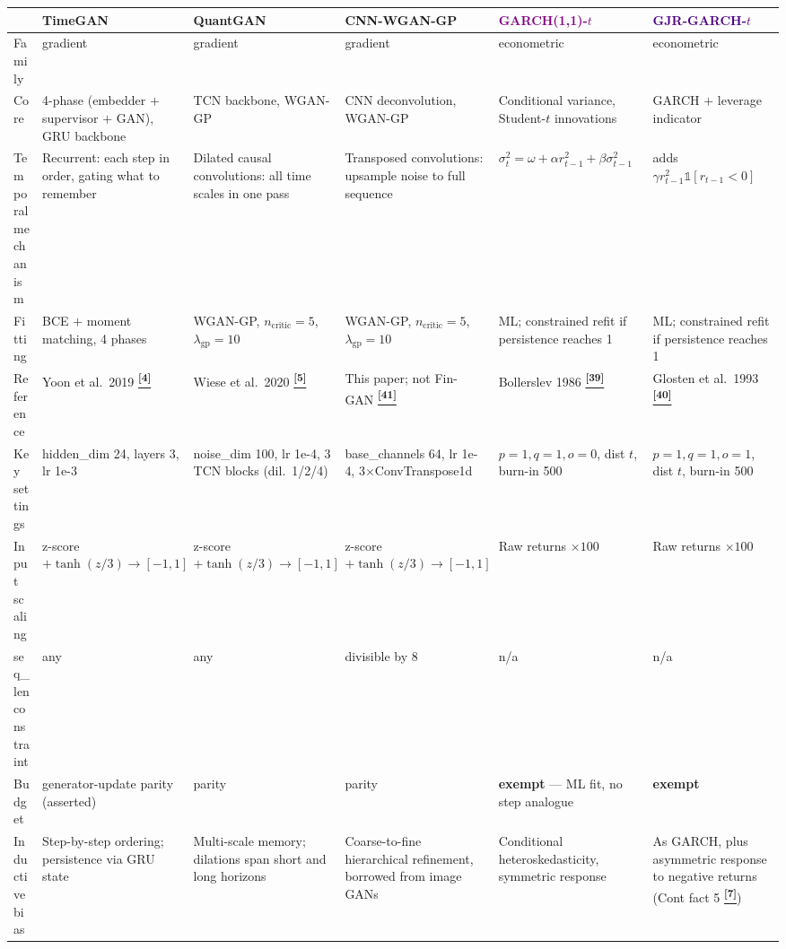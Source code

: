\documentclass[10pt]{article}
\newcommand{\tcite}[1]{%
  \hyperlink{R:#1}{\textsuperscript{\scriptsize\textbf{[#1]}}}}
\begin{document}
\vspace{4pt}
{\footnotesize
\setlength{\tabcolsep}{4pt}
\begin{tabularx}{\linewidth}{@{}lXXXXX@{}}
\toprule
 & \textbf{\textcolor{TGcol}{TimeGAN}} & \textbf{\textcolor{QGcol}{QuantGAN}} & \textbf{\textcolor{FGcol}{CNN-WGAN-GP}} & \textbf{\textcolor{Purple}{GARCH(1,1)-$t$}} & \textbf{\textcolor{Indigo}{GJR-GARCH-$t$}} \\
\midrule
Family & gradient & gradient & gradient & econometric & econometric \\
Core & 4-phase (embedder $+$ supervisor $+$ GAN), GRU backbone & TCN backbone, WGAN-GP & CNN deconvolution, WGAN-GP & Conditional variance, Student-$t$ innovations & GARCH $+$ leverage indicator \\
Temporal mechanism & Recurrent: each step in order, gating what to remember & Dilated causal convolutions: all time scales in one pass & Transposed convolutions: upsample noise to full sequence & $\sigma_t^2=\omega+\alpha r_{t-1}^2+\beta\sigma_{t-1}^2$ & adds $\gamma r_{t-1}^2\mathbb{1}[r_{t-1}<0]$ \\
Fitting & BCE $+$ moment matching, 4 phases & WGAN-GP, $n_\text{critic}=5$, $\lambda_\text{gp}=10$ & WGAN-GP, $n_\text{critic}=5$, $\lambda_\text{gp}=10$ & ML; constrained refit if persistence reaches 1 & ML; constrained refit if persistence reaches 1 \\
Reference & Yoon et al.\ 2019\tcite{4} & Wiese et al.\ 2020\tcite{5} & This paper; not Fin-GAN\tcite{41} & Bollerslev 1986\tcite{39} & Glosten et al.\ 1993\tcite{40} \\
Key settings & hidden\_dim 24, layers 3, lr 1e-3 & noise\_dim 100, lr 1e-4, 3 TCN blocks (dil.\ 1/2/4) & base\_channels 64, lr 1e-4, 3$\times$ConvTranspose1d & $p{=}1,q{=}1,o{=}0$, dist $t$, burn-in 500 & $p{=}1,q{=}1,o{=}1$, dist $t$, burn-in 500 \\
Input scaling & z-score $+\tanh(z/3)\to[-1,1]$ & z-score $+\tanh(z/3)\to[-1,1]$ & z-score $+\tanh(z/3)\to[-1,1]$ & Raw returns $\times100$ & Raw returns $\times100$ \\
seq\_len constraint & any & any & divisible by 8 & n/a & n/a \\
Budget & generator-update parity (asserted) & parity & parity & \textbf{exempt} --- ML fit, no step analogue & \textbf{exempt} \\
Inductive bias & Step-by-step ordering; persistence via GRU state & Multi-scale memory; dilations span short and long horizons & Coarse-to-fine hierarchical refinement, borrowed from image GANs & Conditional heteroskedasticity, symmetric response & As GARCH, plus asymmetric response to negative returns (Cont fact 5\tcite{7}) \\
\bottomrule
\end{tabularx}}
\end{document}
